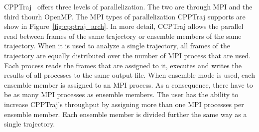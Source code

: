 \label{background}

CPPTraj~\cite{cpptraj-2013} offers three levels of parallelization. The two are through MPI and the third thourh OpenMP.
The MPI types of parallelization CPPTraj supports are show in Figure~\ref{fig:cpptraj_arch}. In more detail,
CCPTraj allows the parallel read between frames of the same trajectory or ensemble members of
the same trajectory. When it is used to analyze a single trajectory, all frames of the trajectory
are equally distributed over the number of MPI process that are used. Each process reads the frames
that are assigned to it, executes and writes the results of all processes to the same output file.
When ensemble mode is used, each ensemble member is assigned to an MPI process. As a consequence,
there have to be as many MPI processes as ensemble members. The user has the ability to increase 
CPPTraj's throughput by assigning more than one MPI processes per ensemble member. Each ensemble 
member is divided further the same way as a single trajectory.
